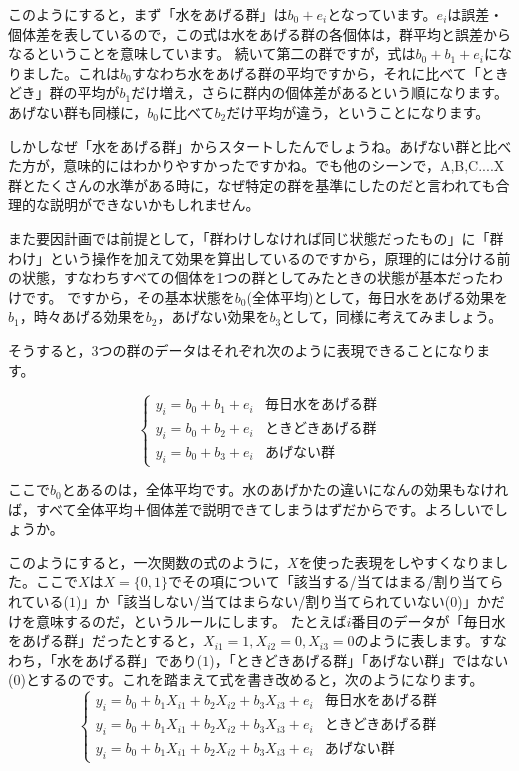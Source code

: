 \documentclass{ltjbook}
\begin{document}
このようにすると，まず「水をあげる群」は$b_0+e_i$となっています。$e_i$は誤差・個体差を表しているので，この式は水をあげる群の各個体は，群平均と誤差からなるということを意味しています。
続いて第二の群ですが，式は$b_0 + b_1 + e_i$になりました。これは$b_0$すなわち水をあげる群の平均ですから，それに比べて「ときどき」群の平均が$b_1$だけ増え，さらに群内の個体差があるという順になります。あげない群も同様に，$b_0$に比べて$b_2$だけ平均が違う，ということになります。

しかしなぜ「水をあげる群」からスタートしたんでしょうね。あげない群と比べた方が，意味的にはわかりやすかったですかね。でも他のシーンで，A,B,C....X群とたくさんの水準がある時に，なぜ特定の群を基準にしたのだと言われても合理的な説明ができないかもしれません。

また要因計画では前提として，「群わけしなければ同じ状態だったもの」に「群わけ」という操作を加えて効果を算出しているのですから，原理的には分ける前の状態，すなわちすべての個体を1つの群としてみたときの状態が基本だったわけです。
ですから，その基本状態を$b_0$(全体平均)として，毎日水をあげる効果を$b_1$，時々あげる効果を$b_2$，あげない効果を$b_3$として，同様に考えてみましょう。

そうすると，3つの群のデータはそれぞれ次のように表現できることになります。

\[
	\label{eq13_01}
	\begin{cases}
		y_{i} = b_0 + b_1 + e_{i} & \mbox{毎日水をあげる群} \\
		y_{i} = b_0 + b_2 + e_{i} & \mbox{ときどきあげる群} \\
		y_{i} = b_0 + b_3 + e_{i} & \mbox{あげない群}
	\end{cases}
\]

ここで$b_0$とあるのは，全体平均です。水のあげかたの違いになんの効果もなければ，すべて全体平均＋個体差で説明できてしまうはずだからです。よろしいでしょうか。

このようにすると，一次関数の式のように，$X$を使った表現をしやすくなりました。ここで$X$は$X=\{0,1\}$でその項について「該当する/当てはまる/割り当てられている($1$)」か「該当しない/当てはまらない/割り当てられていない($0$)」かだけを意味するのだ，というルールにします。
たとえば$i$番目のデータが「毎日水をあげる群」だったとすると，$X_{i1}=1,X_{i2}=0,X_{i3}=0$のように表します。すなわち，「水をあげる群」であり($1$)，「ときどきあげる群」「あげない群」ではない($0$)とするのです。これを踏まえて式を書き改めると，次のようになります。
\[
	\label{eq13_01b}
	\begin{cases}
		y_{i} = b_0 + b_1X_{i1} + b_2X_{i2} + b_3X_{i3} + e_{i} & \mbox{毎日水をあげる群} \\
		y_{i} = b_0 + b_1X_{i1} + b_2X_{i2} + b_3X_{i3} + e_{i} & \mbox{ときどきあげる群} \\
		y_{i} = b_0 + b_1X_{i1} + b_2X_{i2} + b_3X_{i3} + e_{i} & \mbox{あげない群}
	\end{cases}
\]
\end{document}
